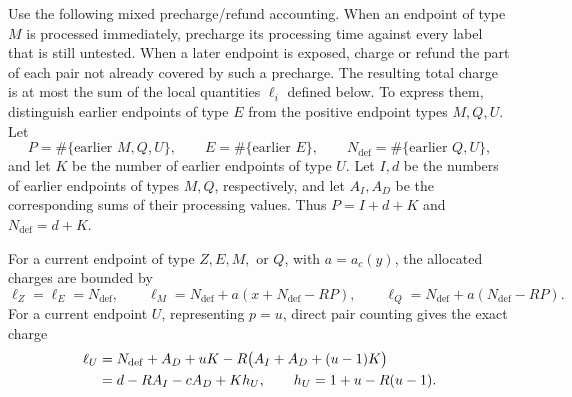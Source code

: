 \begin{claim}
\label{clm:opt:adaptive-local-allocation}
Use the following mixed precharge/refund accounting.  When an endpoint of
type $M$ is processed immediately, precharge its processing time against
every label that is still untested.  When a later endpoint is exposed,
charge or refund the part of each pair not already covered by such a
precharge.  The resulting total charge is at most the sum of the local
quantities $\ell_i$ defined below.  To express them, distinguish earlier endpoints of
type $E$
from the positive endpoint types $M,Q,U$.  Let
\[
 P=\#\{\text{earlier }M,Q,U\},\qquad
 E=\#\{\text{earlier }E\},\qquad
 N_{\mathrm{def}}=\#\{\text{earlier }Q,U\},
\]
and let $K$ be the number of earlier endpoints of type $U$.  Let $I,d$ be the
numbers of earlier endpoints of types $M,Q$, respectively, and let $A_I,A_D$ be the
corresponding sums of their processing values.  Thus
$P=I+d+K$ and $N_{\mathrm{def}}=d+K$.

For a current endpoint of type $Z,E,M,$ or $Q$, with $a=a_c(y)$, the
allocated charges are bounded by
\begin{equation}
 \ell_Z=\ell_E=N_{\mathrm{def}},
 \qquad
 \ell_M=N_{\mathrm{def}}+a(x+N_{\mathrm{def}}-RP),
 \qquad
 \ell_Q=N_{\mathrm{def}}+a(N_{\mathrm{def}}-RP).
 \label{eq:opt:noncapped-local-charges}
\end{equation}
For a current endpoint $U$, representing $p=u$, direct pair counting gives
the exact charge
\begin{align}
 \ell_U
 &=N_{\mathrm{def}}+A_D+uK-R\bigl(A_I+A_D+(u-1)K\bigr)
 \notag\\
 &=d-RA_I-cA_D+K h_U,
 \qquad
 h_U=1+u-R(u-1).
 \label{eq:opt:cap-local-charge}
\end{align}
\end{claim}

